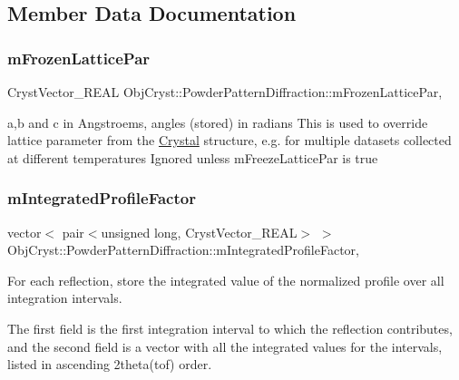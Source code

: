 \subsection{Member Data Documentation}
\mbox{\label{class_obj_cryst_1_1_powder_pattern_diffraction_ad6608c8fe41de123d3dffff7296dd6e6}} 
\subsubsection{\texorpdfstring{mFrozenLatticePar}{mFrozenLatticePar}}
{\footnotesize\ttfamily Cryst\+Vector\+\_\+\+R\+E\+AL Obj\+Cryst\+::\+Powder\+Pattern\+Diffraction\+::m\+Frozen\+Lattice\+Par\hspace{0.3cm}{\ttfamily [mutable]}, {\ttfamily [protected]}}

a,b and c in Angstroems, angles (stored) in radians This is used to override lattice parameter from the \mbox{\hyperlink{class_obj_cryst_1_1_crystal}{Crystal}} structure, e.\+g. for multiple datasets collected at different temperatures Ignored unless m\+Freeze\+Lattice\+Par is true \mbox{\label{class_obj_cryst_1_1_powder_pattern_diffraction_a551115d02944f3e0d360cc92f8084c99}} 
\subsubsection{\texorpdfstring{mIntegratedProfileFactor}{mIntegratedProfileFactor}}
{\footnotesize\ttfamily vector$<$ pair$<$unsigned long, Cryst\+Vector\+\_\+\+R\+E\+AL$>$ $>$ Obj\+Cryst\+::\+Powder\+Pattern\+Diffraction\+::m\+Integrated\+Profile\+Factor\hspace{0.3cm}{\ttfamily [mutable]}, {\ttfamily [protected]}}

For each reflection, store the integrated value of the normalized profile over all integration intervals.

The first field is the first integration interval to which the reflection contributes, and the second field is a vector with all the integrated values for the intervals, listed in ascending 2theta(tof) order. \mbox{\label{class_obj_cryst_1_1_powder_pattern_diffraction_addc10ae4a02801eb441e38b4beae2e9a}} 
